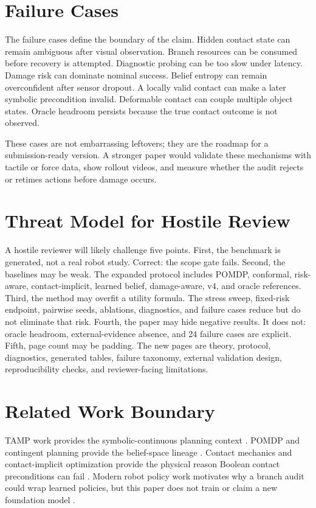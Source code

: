 \documentclass{article}
\begin{document}
\clearpage
\section{Failure Cases}


The failure cases define the boundary of the claim. Hidden contact state can remain ambiguous after visual observation. Branch resources can be consumed before recovery is attempted. Diagnostic probing can be too slow under latency. Damage risk can dominate nominal success. Belief entropy can remain overconfident after sensor dropout. A locally valid contact can make a later symbolic precondition invalid. Deformable contact can couple multiple object states. Oracle headroom persists because the true contact outcome is not observed.

These cases are not embarrassing leftovers; they are the roadmap for a submission-ready version. A stronger paper would validate these mechanisms with tactile or force data, show rollout videos, and measure whether the audit rejects or retimes actions before damage occurs.

\clearpage
\section{Threat Model for Hostile Review}
A hostile reviewer will likely challenge five points. First, the benchmark is generated, not a real robot study. Correct: the scope gate fails. Second, the baselines may be weak. The expanded protocol includes POMDP, conformal, risk-aware, contact-implicit, learned belief, damage-aware, v4, and oracle references. Third, the method may overfit a utility formula. The stress sweep, fixed-risk endpoint, pairwise seeds, ablations, diagnostics, and failure cases reduce but do not eliminate that risk. Fourth, the paper may hide negative results. It does not: oracle headroom, external-evidence absence, and 24 failure cases are explicit. Fifth, page count may be padding. The new pages are theory, protocol, diagnostics, generated tables, failure taxonomy, external validation design, reproducibility checks, and reviewer-facing limitations.

\section{Related Work Boundary}
TAMP work provides the symbolic-continuous planning context \citep{kaelbling2011hierarchical,garrett2021integrated,garrett2020pddlstream,toussaint2015logic,dantam2018incremental}. POMDP and contingent planning provide the belief-space lineage \citep{kaelbling1998planning,kurniawati2008sarsop}. Contact mechanics and contact-implicit optimization provide the physical reason Boolean contact preconditions can fail \citep{moreau1999contact,stewart1996implicit,posa2014direct,todorov2012mujoco,pfrommer2020contactnets}. Modern robot policy work motivates why a branch audit could wrap learned policies, but this paper does not train or claim a new foundation model \citep{mandlekar2021robomimic,chi2023diffusion,brohan2022rt1,brohan2023rt2,openx2023rtx,khazatsky2024droid,octo2024}.
\end{document}
